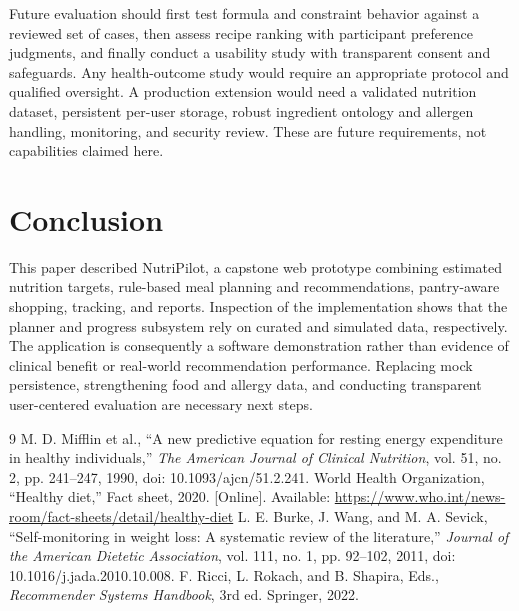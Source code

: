 \documentclass[10pt,twocolumn]{article}
\begin{document}
Future evaluation should first test formula and constraint behavior against a reviewed set of cases, then assess recipe ranking with participant preference judgments, and finally conduct a usability study with transparent consent and safeguards. Any health-outcome study would require an appropriate protocol and qualified oversight. A production extension would need a validated nutrition dataset, persistent per-user storage, robust ingredient ontology and allergen handling, monitoring, and security review. These are future requirements, not capabilities claimed here.

\section{Conclusion}
This paper described NutriPilot, a capstone web prototype combining estimated nutrition targets, rule-based meal planning and recommendations, pantry-aware shopping, tracking, and reports. Inspection of the implementation shows that the planner and progress subsystem rely on curated and simulated data, respectively. The application is consequently a software demonstration rather than evidence of clinical benefit or real-world recommendation performance. Replacing mock persistence, strengthening food and allergy data, and conducting transparent user-centered evaluation are necessary next steps.

\begin{thebibliography}{9}\small
{} M. D. Mifflin et al., ``A new predictive equation for resting energy expenditure in healthy individuals,'' \emph{The American Journal of Clinical Nutrition}, vol. 51, no. 2, pp. 241--247, 1990, doi: 10.1093/ajcn/51.2.241.
 World Health Organization, ``Healthy diet,'' Fact sheet, 2020. [Online]. Available: \url{https://www.who.int/news-room/fact-sheets/detail/healthy-diet}
 L. E. Burke, J. Wang, and M. A. Sevick, ``Self-monitoring in weight loss: A systematic review of the literature,'' \emph{Journal of the American Dietetic Association}, vol. 111, no. 1, pp. 92--102, 2011, doi: 10.1016/j.jada.2010.10.008.
 F. Ricci, L. Rokach, and B. Shapira, Eds., \emph{Recommender Systems Handbook}, 3rd ed. Springer, 2022.
\end{thebibliography}
\end{document}
